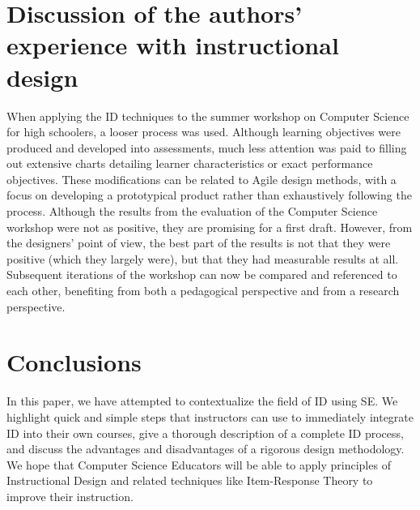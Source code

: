 

\section{Discussion of the authors' experience with instructional design}

When applying the ID techniques to the summer workshop on Computer Science for high schoolers, a looser process was used.
Although learning objectives were produced and developed into assessments, much less attention was paid to filling out extensive charts detailing learner characteristics or exact performance objectives.
These modifications can be related to Agile design methods, with a focus on developing a prototypical product rather than exhaustively following the process.
Although the results from the evaluation of the Computer Science workshop were not as positive, they are promising for a first draft. 
However, from the designers' point of view, the best part of the results is not that they were positive (which they largely were), but that they had measurable results at all.
Subsequent iterations of the workshop can now be compared and referenced to each other, benefiting from both a pedagogical perspective and from a research perspective.


\section{Conclusions}

In this paper, we have attempted to contextualize the field of ID using SE.
We highlight quick and simple steps that instructors can use to immediately integrate ID into their own courses, give a thorough description of a complete ID process, and discuss the advantages and disadvantages of a rigorous design methodology.
We hope that Computer Science Educators will be able to apply principles of Instructional Design and related techniques like Item-Response Theory to improve their instruction.